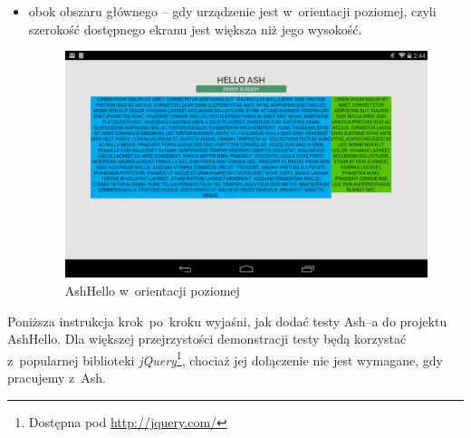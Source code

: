 \documentclass{xmgr}
\begin{document}
\begin{itemize}
  \item obok obszaru głównego -- gdy urządzenie jest w~orientacji poziomej, czyli szerokość dostępnego ekranu jest większa niż jego wysokość.

\begin{figure}[h]
    \centering
    \includegraphics[scale=0.25]{hello2.png}
    \caption{AshHello w~orientacji poziomej}
    \label{fig:AshHello2}
\end{figure}
\end{itemize}

Poniższa instrukcja krok~po~kroku wyjaśni, jak dodać testy Ash--a do projektu AshHello. Dla większej przejrzystości demonstracji testy będą korzystać z~popularnej biblioteki \textit{jQuery}\footnote{Dostępna pod \url{http://jquery.com/}}, chociaż jej dołączenie nie jest wymagane, gdy pracujemy z~Ash.  
\end{document}
